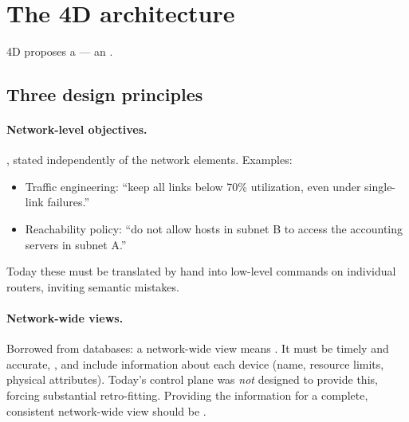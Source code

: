 \section{The 4D architecture}
4D proposes a  --- an .

\subsection{Three design principles}
\paragraph{Network-level objectives.} , stated independently of the network elements. Examples:
\begin{itemize}
\item Traffic engineering: ``keep all links below 70\% utilization, even under single-link failures.''
\item Reachability policy: ``do not allow hosts in subnet B to access the accounting servers in subnet A.''
\end{itemize}
Today these must be translated by hand into low-level commands on individual routers, inviting semantic mistakes.

\paragraph{Network-wide views.} Borrowed from databases: a network-wide view means . It must be timely and accurate, , and include information about each device (name, resource limits, physical attributes). Today's control plane was \emph{not} designed to provide this, forcing substantial retro-fitting. Providing the information for a complete, consistent network-wide view should be .

